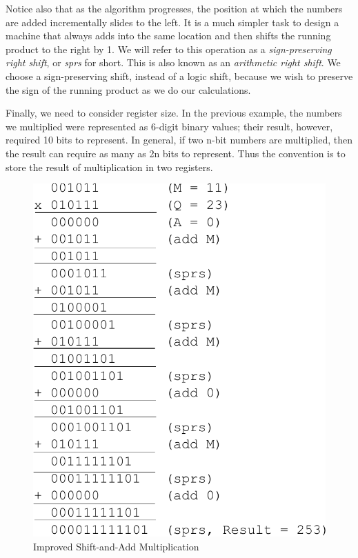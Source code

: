 \documentclass{article}
\begin{document}
Notice also that as the algorithm progresses, the position at which the numbers are added incrementally slides to the left.
It is a much simpler task to design a machine that always adds into the same location and then shifts the running product to the right by 1.
We will refer to this operation as a \emph{sign-preserving right shift}, or \emph{sprs} for short.
This is also known as an \emph{arithmetic right shift}.
We choose a sign-preserving shift, instead of a logic shift, because we wish to preserve the sign of the running product as we do our calculations.

Finally, we need to consider register size.
In the previous example, the numbers we multiplied were represented as 6-digit binary values; their result, however, required 10 bits to represent.
In general, if two n-bit numbers are multiplied, then the result can require as many as 2n bits to represent.
Thus the convention is to store the result of multiplication in two registers.

\pagebreak

\begin{figure}
\centering
\includegraphics[scale=0.7]{isaam2.pdf}
\caption{Improved Shift-and-Add Multiplication}
\end{figure}
\end{document}
